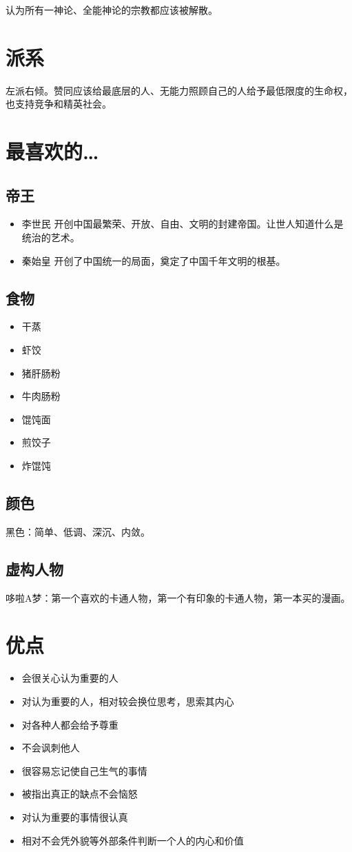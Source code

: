 \documentclass[UTF8]{ctexart}
\begin{document}
认为所有一神论、全能神论的宗教都应该被解散。
\section{派系}
左派右倾。赞同应该给最底层的人、无能力照顾自己的人给予最低限度的生命权，也支持竞争和精英社会。
\section{最喜欢的…}
\subsection{帝王}
\begin{itemize}
\item 李世民 开创中国最繁荣、开放、自由、文明的封建帝国。让世人知道什么是统治的艺术。
\item 秦始皇 开创了中国统一的局面，奠定了中国千年文明的根基。
\end{itemize}
\subsection{食物}
\begin{itemize}
\item 干蒸
\item 虾饺
\item 猪肝肠粉
\item 牛肉肠粉
\item 馄饨面
\item 煎饺子
\item 炸馄饨
\end{itemize}
\subsection{颜色}
黑色：简单、低调、深沉、内敛。
\subsection{虚构人物}
哆啦A梦：第一个喜欢的卡通人物，第一个有印象的卡通人物，第一本买的漫画。
\section{优点}
\begin{itemize}
\item 会很关心认为重要的人
\item 对认为重要的人，相对较会换位思考，思索其内心
\item 对各种人都会给予尊重
\item 不会讽刺他人
\item 很容易忘记使自己生气的事情
\item 被指出真正的缺点不会恼怒
\item 对认为重要的事情很认真
\item 相对不会凭外貌等外部条件判断一个人的内心和价值
\end{itemize}
\end{document}
